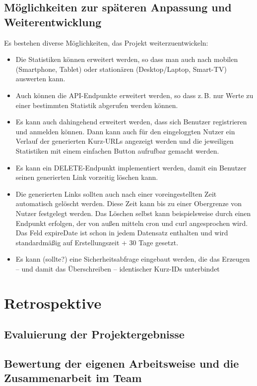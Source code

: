 \documentclass[a4paper,11pt,DIV=12,overfullrule=on]{scrreprt}%
\begin{document}
\section{Möglichkeiten zur späteren Anpassung und Weiterentwicklung}
Es bestehen diverse Möglichkeiten, das Projekt weiterzuentwickeln:
\begin{itemize}
    \item Die Statistiken können erweitert werden, so dass man auch nach mobilen (Smartphone, Tablet) oder stationären (Desktop/Laptop, Smart-TV) auswerten kann.
    \item Auch können die \ac{API}-Endpunkte erweitert werden, so dass z.\,B. nur Werte zu einer bestimmten Statistik abgerufen werden können.
    \item Es kann auch dahingehend erweitert werden, dass sich Benutzer registrieren und anmelden können. Dann kann auch für den eingeloggten Nutzer ein Verlauf der generierten Kurz-\ac{URL}s angezeigt werden und die jeweiligen Statistiken mit einem einfachen Button aufrufbar gemacht werden.
    \item Es kann ein DELETE-Endpunkt implementiert werden, damit ein Benutzer seinen generierten Link vorzeitig löschen kann.
    \item Die generierten Links sollten auch nach einer voreingestellten Zeit automatisch gelöscht werden. Diese Zeit kann bis zu einer Obergrenze von Nutzer festgelegt werden. Das Löschen selbst kann beispielsweise durch einen Endpunkt erfolgen, der von außen mitteln {\ttfamily cron} und {\ttfamily curl} angesprochen wird. Das Feld {\ttfamily expireDate} ist schon in jedem Datensatz enthalten und wird standardmäßig auf Erstellungszeit $+$ 30 Tage gesetzt.
    \item \label{sec:ErweiterungKollision}Es kann (sollte?) eine Sicherheitsabfrage eingebaut werden, die das Erzeugen – und damit das Überschreiben – identischer Kurz-IDs unterbindet
\end{itemize}
    
\chapter{Retrospektive}
\section{Evaluierung der Projektergebnisse}
\section{Bewertung der eigenen Arbeitsweise und die Zusammenarbeit im Team}
\end{document}
